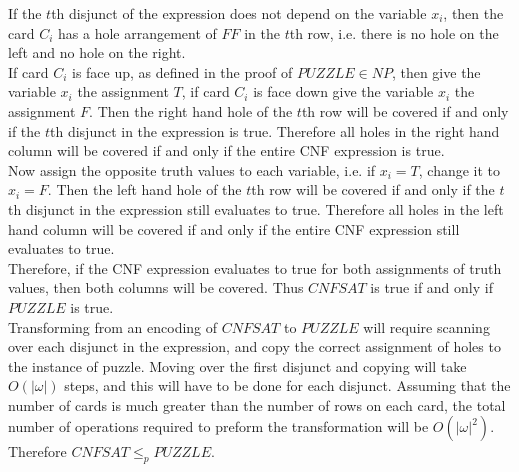\documentclass{assignment}
\begin{document}
\begin{problemlist}
\begin{answer}
If the $t$th disjunct of the expression does not depend on the variable $x_i$, then the card $C_i$ has a hole arrangement of $FF$ in the $t$th row, i.e. there is no hole on the left and no hole on the right.\\
If card $C_i$ is face up, as defined in the proof of $PUZZLE \in NP$, then give the variable $x_i$ the assignment $T$, if card $C_i$ is face down give the variable $x_i$ the assignment $F$. Then the right hand hole of the $t$th row will be covered if and only if the $t$th disjunct in the expression is true. Therefore all holes in the right hand column will be covered if and only if the entire CNF expression is true.\\
Now assign the opposite truth values to each variable, i.e. if $x_i=T$, change it to $x_i=F$. Then the left hand hole of the $t$th row will be covered if and only if the $t$th disjunct in the expression still evaluates to true. Therefore all holes in the left hand column will be covered if and only if the entire CNF expression still evaluates to true.\\
Therefore, if the CNF expression evaluates to true for both assignments of truth values, then both columns will be covered. Thus $CNFSAT$ is true if and only if $PUZZLE$ is true.\\
Transforming from an encoding of $CNFSAT$ to $PUZZLE$ will require scanning over each disjunct in the expression, and copy the correct assignment of holes to the instance of puzzle. Moving over the first disjunct and copying will take $O(|\omega|)$ steps, and this will have to be done for each disjunct. Assuming that the number of cards is much greater than the number of rows on each card, the total number of operations required to preform the transformation will be $O(|\omega|^2)$.\\
Therefore $CNFSAT \le_p PUZZLE$.\\
\end{answer}
\end{problemlist}
\end{document}
